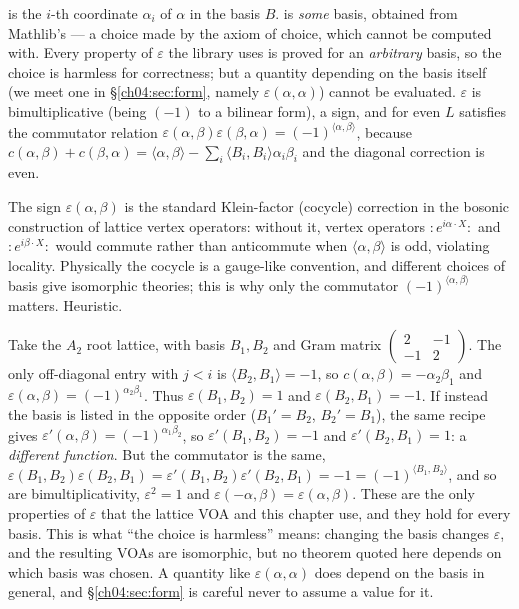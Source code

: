 \begin{dictionary}
 is the $i$-th coordinate $\alpha_i$ of $\alpha$ in the basis $B$.
 is \emph{some} basis, obtained from Mathlib's 
--- a choice made by the axiom of choice, which cannot be computed with. Every property of
$\varepsilon$ the library uses is proved for an \emph{arbitrary} basis, so the choice is harmless
for correctness; but a quantity depending on the basis itself (we meet one in
\S\ref{ch04:sec:form}, namely $\varepsilon(\alpha,\alpha)$) cannot be evaluated. $\varepsilon$ is
bimultiplicative (being $(-1)$ to a bilinear form), a sign, and for even $L$ satisfies the
commutator relation $\varepsilon(\alpha,\beta)\varepsilon(\beta,\alpha)=(-1)^{\langle\alpha,\beta\rangle}$,
because $c(\alpha,\beta)+c(\beta,\alpha)=\langle\alpha,\beta\rangle-\sum_i\langle B_i,B_i\rangle
\alpha_i\beta_i$ and the diagonal correction is even.
\end{dictionary}

\begin{physics}
The sign $\varepsilon(\alpha,\beta)$ is the standard Klein-factor (cocycle) correction in the bosonic construction of lattice vertex operators: without it, vertex operators $:\!e^{i\alpha\cdot X}\!:$ and $:\!e^{i\beta\cdot X}\!:$ would commute rather than anticommute when $\langle\alpha,\beta\rangle$ is odd, violating locality. Physically the cocycle is a gauge-like convention, and different choices of basis give isomorphic theories; this is why only the commutator $(-1)^{\langle\alpha,\beta\rangle}$ matters. Heuristic.
\end{physics}

\begin{example}\label{ch04:ex:cocycle}
Take the $A_2$ root lattice, with basis $B_1,B_2$ and Gram matrix
$\left(\begin{smallmatrix}2&-1\\-1&2\end{smallmatrix}\right)$. The only off-diagonal entry with
$j<i$ is $\langle B_2,B_1\rangle=-1$, so $c(\alpha,\beta)=-\alpha_2\beta_1$ and
$\varepsilon(\alpha,\beta)=(-1)^{\alpha_2\beta_1}$. Thus $\varepsilon(B_1,B_2)=1$ and
$\varepsilon(B_2,B_1)=-1$. If instead the basis is listed in the opposite order ($B_1'=B_2$,
$B_2'=B_1$), the same recipe gives $\varepsilon'(\alpha,\beta)=(-1)^{\alpha_1\beta_2}$, so
$\varepsilon'(B_1,B_2)=-1$ and $\varepsilon'(B_2,B_1)=1$: a \emph{different function}. But the
commutator is the same, $\varepsilon(B_1,B_2)\varepsilon(B_2,B_1)=\varepsilon'(B_1,B_2)\varepsilon'(B_2,B_1)
=-1=(-1)^{\langle B_1,B_2\rangle}$, and so are bimultiplicativity, $\varepsilon^2=1$ and
$\varepsilon(-\alpha,\beta)=\varepsilon(\alpha,\beta)$. These are the only properties of $\varepsilon$
that the lattice VOA and this chapter use, and they hold for every basis. This is what ``the choice
is harmless'' means: changing the basis changes $\varepsilon$, and the resulting VOAs are isomorphic,
but no theorem quoted here depends on which basis was chosen. A quantity like
$\varepsilon(\alpha,\alpha)$ does depend on the basis in general, and \S\ref{ch04:sec:form} is careful
never to assume a value for it.
\end{example}

